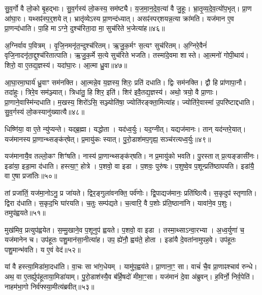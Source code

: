 सु॒व॒र्गो वै लो॒को बृ॒हद्भाः।
सु॒व॒र्गस्य॑ लो॒कस्य॒ सम॑ष्ट्यै।
य॒ज॒मा॒न॒दे॒व॒त्या॑ वै जु॒हूः।
भ्रा॒तृ॒व्य॒दे॒व॒त्यो॑प॒भृत्।
प्रा॒ण आ॑घा॒रः।
यथ्सꣴ॑स्प॒र्॒शयेत्।
भ्रातृ॑व्येऽस्य प्रा॒णन्द॑ध्यात्।
असꣴ॑स्पर्‌\mbox{}शयन्न॒त्या क्रा॑मति।
यज॑मान ए॒व प्रा॒णन्द॑धाति।
पा॒हि मा\-ऽग्ने॒ दुश्च॑रिता॒दा मा॒ सुच॑रिते भ॒जेत्या॑ह॥४६॥

अ॒ग्निर्वाव प॒वित्रम्।
वृ॒जि॒नमनृ॑त॒न्दुश्च॑रितम्।
ऋ॒जु॒क॒र्मꣳ स॒त्यꣳ सुच॑रितम्।
अ॒ग्निरे॒वैनं॑ वृजि॒नादनृ॑ता॒द्दुश्च॑रितात्पाति।
ऋ॒जु॒क॒र्मे स॒त्ये सुच॑रिते भजति।
तस्मा॑दे॒वमा शास्ते।
आ॒त्मनो॑ गोपी॒थाय॑।
शिरो॒ वा ए॒तद्य॒ज्ञस्य॑।
यदा॑घा॒रः।
आ॒त्मा ध्रु॒वा॥४७॥

आ॒घा॒रमा॒घार्य॑ ध्रु॒वाꣳ सम॑नक्ति।
आ॒त्मन्ने॒व य॒ज्ञस्य॒ शिरः॒ प्रति॑ दधाति।
द्विः सम॑नक्ति।
द्वौ हि प्रा॑णापा॒नौ।
तदा॑हुः।
त्रिरे॒व सम॑ञ्ज्यात्।
त्रिधा॑तु॒ हि शिर॒ इति॑।
शिर॑ इवै॒तद्य॒ज्ञस्य॑।
अथो॒ त्रयो॒ वै प्रा॒णाः।
प्रा॒णाने॒वास्मि॑न्दधाति।
म॒खस्य॒ शिरो॑ऽसि॒ सञ्ज्योति॑षा॒ ज्योति॑रङ्क्ता॒मित्या॑ह।
ज्योति॑रे॒वास्मा॑ उ॒परि॑ष्टाद्दधाति।
सु॒व॒र्गस्य॑ लो॒कस्यानु॑ख्यात्यै॥४८॥\anuvakamend[परि॑दधाति प्रा॒णन्द॑धाति॒ हि य॒ज्ञो घा॑रयति॒ नम॒ इत्या॑ह प॒श्चाद्वी॒र्या॑णीत्या॑ह॒ भा इत्या॑ह भ॒जेत्या॑ह ध्रु॒वैवास्मि॑न्दधाति॒ त्रीणि॑ च]

धिष्णि॑या॒ वा ए॒ते न्यु॑प्यन्ते।
यद्ब्र॒ह्मा।
यद्धोता।
यद॑ध्व॒र्युः।
यद॒ग्नीत्।
यद्यज॑मानः।
तान् यद॑न्तरे॒यात्।
यज॑मानस्य प्रा॒णान्थ्सङ्क॑र्‌\mbox{}षेत्।
प्र॒मायु॑कः स्यात्।
पु॒रो॒डाश॑मप॒गृह्य॒ सञ्च॑रत्यध्व॒र्युः॥४९॥

यज॑मानायै॒व तल्लो॒कꣳ शिꣳ॑षति।
नास्य॑ प्रा॒णान्थ्सङ्क॑र्‌\mbox{}षति।
न प्र॒मायु॑को भवति।
पु॒रस्तात् प्र॒त्यङ्ङासी॑नः।
इडा॑या॒ इडा॒मा द॑धाति।
हस्त्या॒ꣳ॒ होत्रे।
प॒शवो॒ वा इडा।
प॒शवः॒ पुरु॑षः।
प॒शुष्वे॒व प॒शून्प्रति॑ष्ठापयति।
इडा॑यै॒ वा ए॒षा प्रजा॑तिः॥५०॥

तां प्रजा॑तिं॒ यज॑मा॒नोऽनु॒ प्र जा॑यते।
द्विर॒ङ्गुला॑वनक्ति॒ पर्व॑णोः।
द्वि॒पाद्यज॑मानः॒ प्रति॑ष्ठित्यै।
स॒कृदुप॑ स्तृणाति।
द्विरा द॑धाति।
स॒कृद॒भि घा॑रयति।
च॒तुः सम्प॑द्यते।
च॒त्वारि॒ वै प॒शोः प्र॑ति॒ष्ठाना॑नि।
यावा॑ने॒व प॒शुः।
तमुप॑ह्वयते॥५१॥

मुख॑मिव॒ प्रत्युप॑ह्वयेत।
स॒म्मु॒खाने॒व प॒शूनुप॑ ह्वयते।
प॒शवो॒ वा इडा।
तस्मा॒थ्सा\-ऽन्वा॒रभ्या।
अ॒ध्व॒र्युणा॑ च॒ यज॑मानेन च।
उप॑हूतः पशु॒मान॑सा॒नीत्या॑ह।
उप॒ ह्ये॑नौ॒ ह्वय॑ते॒ होता।
इडा॑यै दे॒वता॑नामुपह॒वे।
उप॑हूतः पशु॒मान्भ॑वति।
य ए॒वं वेद॑॥५२॥

यां वै हस्त्या॒मिडा॑मा॒दधा॑ति।
वा॒चः सा भा॑ग॒धेयम्।
यामु॑प॒ह्वय॑ते।
प्रा॒णाना॒ꣳ॒ सा।
वाचं॑ चै॒व प्रा॒णाꣴश्चाव॑ रुन्धे।
अथ॒ वा ए॒तर्ह्युप॑हूताया॒मिडा॑याम्।
पु॒रो॒डाश॑स्यै॒व ब॑र्हि॒षदो॑ मीमा॒ꣳ॒सा।
यज॑मानं दे॒वा अ॑ब्रुवन्।
ह॒विर्नो॒ निर्व॒पेति॑।
नाहम॑भा॒गो निर्व॑फ्स्या॒मीत्य॑ब्रवीत्॥५३॥

